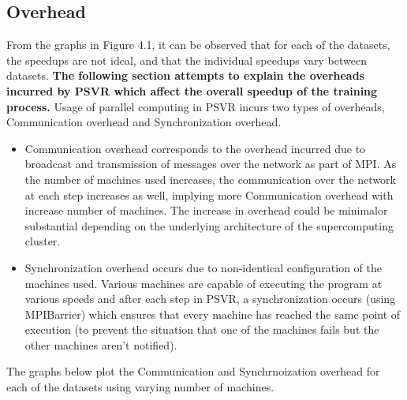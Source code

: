 \documentclass[12pt]{article}
\begin{document}
\subsection{Overhead}
\label{Overhead}
From the graphs in Figure 4.1, it can be observed that for each of the datasets, the speedups are not ideal, and that the individual speedups vary between datasets.
{\bf The following section attempts to explain the overheads incurred by PSVR which affect the overall speedup of the training process.}
\newline\newline
Usage of parallel computing in PSVR incurs two types of overheads, Communication overhead and Synchronization overhead.
\begin{itemize}
\item Communication overhead corresponds to the overhead incurred due to broadcast and transmission of messages over the network as part of MPI. 
\newline
As the number of machines used increases, the communication over the network at each step increases as well, implying more Communication overhead with increase number of machines. The increase in overhead could be minimal\footnotemark or substantial depending on the underlying architecture of the supercomputing cluster.
\item Synchronization overhead occurs due to non-identical configuration of the machines used. Various machines are capable of executing the program at various speeds and after each step in PSVR, a synchronization occurs (using MPIBarrier) which ensures that every machine has reached the same point of execution (to prevent the situation that one of the machines fails but the other machines aren't notified).
\end{itemize}
The graphs below plot the Communication and Synchrnoization overhead for each of the datasets using varying number of machines.
\end{document}
